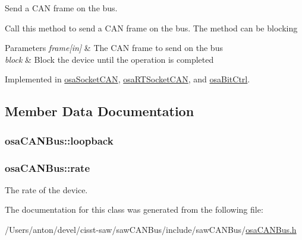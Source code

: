 Send a C\+A\+N frame on the bus. 

Call this method to send a C\+A\+N frame on the bus. The method can be blocking 
\begin{DoxyParams}{Parameters}
{\em frame\mbox{[}in\mbox{]}} & The C\+A\+N frame to send on the bus \\
\hline
{\em block} & Block the device until the operation is completed \\
\hline
\end{DoxyParams}


Implemented in \hyperlink{classosa_socket_c_a_n_a59accc9278f0cbab72e578bb8d486a43}{osa\+Socket\+C\+A\+N}, \hyperlink{classosa_r_t_socket_c_a_n_aa1f62bdadfb3481ca3f96a8152e22508}{osa\+R\+T\+Socket\+C\+A\+N}, and \hyperlink{classosa_bit_ctrl_a8bb8bcf5e56ce2e844dc9d5e5fa01b5c}{osa\+Bit\+Ctrl}.



\subsection{Member Data Documentation}
\hypertarget{classosa_c_a_n_bus_a724e9c478dd48908882e29f189d98968}{}
\subsubsection[{loopback}]{ osa\+C\+A\+N\+Bus\+::loopback\hspace{0.3cm}{\ttfamily [protected]}}\label{classosa_c_a_n_bus_a724e9c478dd48908882e29f189d98968}
\hypertarget{classosa_c_a_n_bus_a4ff86a9ecf19161b1f34666888e0a331}{}
\subsubsection[{rate}]{ osa\+C\+A\+N\+Bus\+::rate\hspace{0.3cm}{\ttfamily [protected]}}\label{classosa_c_a_n_bus_a4ff86a9ecf19161b1f34666888e0a331}


The rate of the device. 



The documentation for this class was generated from the following file\+:\begin{DoxyCompactItemize}
\item 
/\+Users/anton/devel/cisst-\/saw/saw\+C\+A\+N\+Bus/include/saw\+C\+A\+N\+Bus/\hyperlink{osa_c_a_n_bus_8h}{osa\+C\+A\+N\+Bus.\+h}\end{DoxyCompactItemize}
